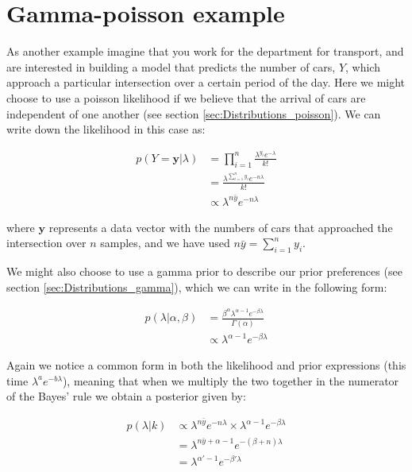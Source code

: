 \documentclass[11pt,fullpage]{book}
\begin{document}
\section{Gamma-poisson example}
As another example imagine that you work for the department for transport, and are interested in building a model that predicts the number of cars, $Y$, which approach a particular intersection over a certain period of the day. Here we might choose to use a poisson likelihood if we believe that the arrival of cars are independent of one another (see section \ref{sec:Distributions_poisson}). We can write down the likelihood in this case as:

\begin{align}
p(Y=\boldsymbol{y}|\lambda) &= \prod\limits_{i=1}^{n} \frac{\lambda^{y_i} e^{-\lambda}}{k!}\\
&= \frac{\lambda^{\sum\limits_{i=1}^{n}y_i} e^{-n\lambda}}{k!}\\
&\propto \lambda^{n \bar{y}} e^{-n\lambda}
\end{align}

where $\boldsymbol{y}$ represents a data vector with the numbers of cars that approached the intersection over $n$ samples, and we have used $n \bar{y} = \sum\limits_{i=1}^{n}y_i$.

We might also choose to use a gamma prior to describe our prior preferences (see section \ref{sec:Distributions_gamma}), which we can write in the following form:

\begin{align}\label{eq:Conjugate_gammaPrior}
p(\lambda|\alpha,\beta) &= \frac{\beta^\alpha \lambda^{\alpha-1} e^{-\beta \lambda}}{\Gamma(\alpha)}\\
&\propto \lambda^{\alpha-1} e^{-\beta \lambda}
\end{align}

Again we notice a common form in both the likelihood and prior expressions (this time $\lambda^a e^{-b \lambda}$), meaning that when we multiply the two together in the numerator of the Bayes' rule we obtain a posterior given by:

\begin{align}
p(\lambda|k) &\propto \lambda^{n \bar{y}} e^{-n\lambda} \times \lambda^{\alpha-1} e^{-\beta \lambda}\\
&= \lambda^{n \bar{y} + \alpha-1} e^{-(\beta+n) \lambda}\\
&= \lambda^{\alpha'-1} e^{-\beta' \lambda}
\end{align}
\end{document}
